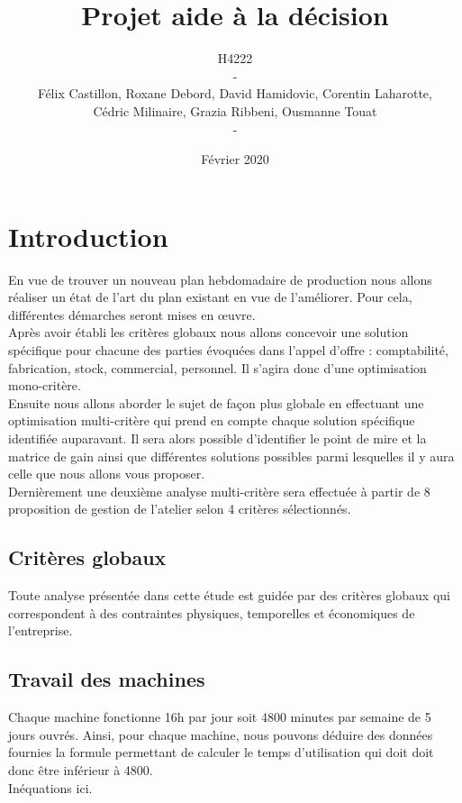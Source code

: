 \documentclass{article}
\title{{\Huge Projet aide à la décision}}
\author{{\Large
H4222}\\
-
\\
Félix Castillon, Roxane Debord, David Hamidovic, Corentin Laharotte,\\
Cédric Milinaire, Grazia Ribbeni, Ousmanne Touat\\
-}
\date{Février 2020}
\begin{document}
\maketitle
\thispagestyle{empty}

\section{Introduction}
En vue de trouver un nouveau plan hebdomadaire de production nous allons réaliser un état de l’art du plan existant en vue de l’améliorer. Pour cela, différentes démarches seront mises en œuvre.\\

Après avoir établi les critères globaux nous allons concevoir une solution spécifique pour chacune des parties évoquées dans l’appel d’offre : comptabilité, fabrication, stock, commercial, personnel. Il s'agira donc d'une optimisation mono-critère.\\
Ensuite nous allons aborder le sujet de façon plus globale en effectuant une optimisation multi-critère qui prend en compte chaque solution spécifique identifiée auparavant. Il sera alors possible d'identifier le point de mire et la matrice de gain ainsi que différentes solutions possibles parmi lesquelles il y aura celle que nous allons vous proposer.\\
Dernièrement une deuxième analyse multi-critère sera effectuée à partir de 8 proposition de gestion de l'atelier selon 4 critères sélectionnés.

\subsection{Critères globaux}
Toute analyse présentée dans cette étude est guidée par des critères globaux qui correspondent à des contraintes physiques, temporelles et économiques de l'entreprise.\\

\subsection{Travail des machines}
Chaque machine fonctionne 16h par jour soit 4800 minutes par semaine de 5 jours ouvrés.
Ainsi, pour chaque machine, nous pouvons déduire des données fournies la formule permettant de calculer le temps d'utilisation qui doit doit donc être inférieur à 4800.\\

Inéquations ici.
\end{document}
